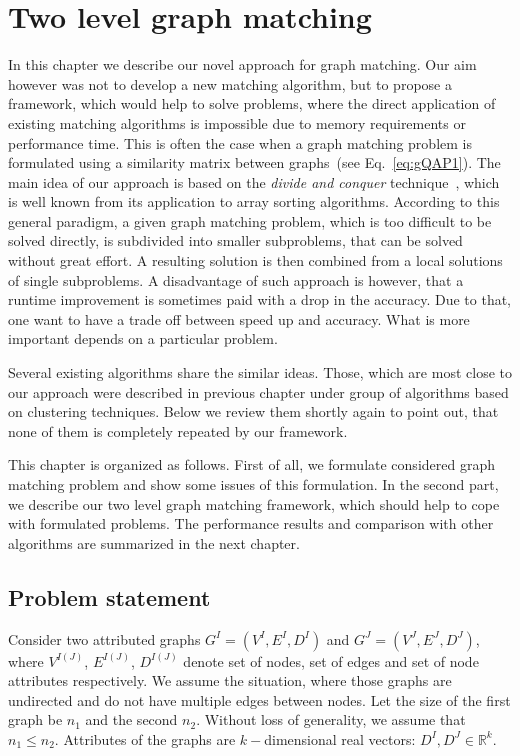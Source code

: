 \chapter{Two level graph matching} \label{chapter:2levelGM}
In this chapter we describe our novel approach for graph matching. Our aim however was not to develop a new matching algorithm, but to propose a framework, which would help to solve problems, where the direct application of existing matching algorithms is impossible due to memory requirements or performance time. This is often the case when a graph matching problem is formulated using a similarity matrix between graphs~(see Eq.~\eqref{eq:gQAP1}). The main idea of our approach is based on the  \emph{divide and conquer} technique~\cite{Cormen}, which is well known from its application to array sorting algorithms. According to this general paradigm, a given graph matching problem, which is too difficult to be solved directly, is subdivided into smaller subproblems, that can be solved without great effort. A resulting solution is then combined from a local solutions of single subproblems. A disadvantage of such approach is however, that a runtime improvement is sometimes paid with a drop in the accuracy.
Due to that, one want to have a trade off between speed up and accuracy. What is more important depends on a particular problem.

Several existing algorithms share the similar ideas. Those, which are most close to our approach were described in previous chapter under group of algorithms based on clustering techniques. Below we review them shortly again to point out, that none of them is completely repeated by our framework.

This chapter is organized as follows. First of all, we formulate considered graph matching problem and show some issues of this formulation. In the second part, we describe our two level graph matching framework, which should help to cope with formulated problems. The performance results and comparison with other algorithms are summarized in the next chapter. 
\section{Problem statement} \label{sec:prob_stat}
Consider two attributed graphs $G^I = (V^I, E^I, D^I)$ and $G^J = (V^J, E^J, D^J)$, where $V^{I(J)}$, $E^{I(J)}$, $D^{I(J)}$ denote set of nodes, set of edges and set of node attributes respectively. We assume the situation, where those graphs are undirected and do not have multiple edges between nodes. Let the size of the first graph be $n_1$ and the second $n_2$. Without loss of generality, we assume that $n_1\le n_2$. Attributes of the graphs are $k-$dimensional real vectors: $D^I,D^J\in\mathbb{R}^k$.

